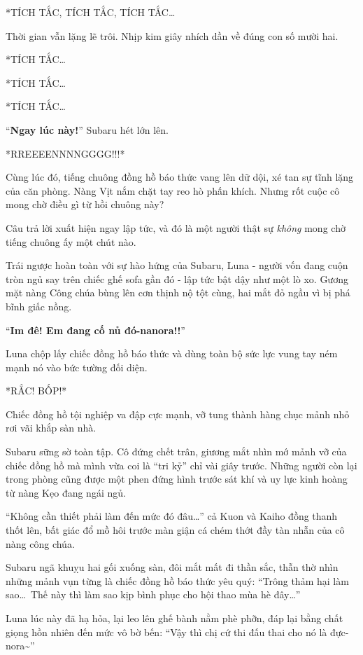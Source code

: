 \documentclass[../main.tex]{subfiles}
\begin{document}
*TÍCH TẮC, TÍCH TẮC, TÍCH TẮC\dots*

Thời gian vẫn lặng lẽ trôi. Nhịp kim giây nhích dần về đúng con số mười hai.

*TÍCH TẮC\dots*

*TÍCH TẮC\dots*

*TÍCH TẮC\dots*

``\textbf{Ngay lúc này!}'' Subaru hét lớn lên.

*RREEEENNNNGGGG!!!*

Cùng lúc đó, tiếng chuông đồng hồ báo thức vang lên dữ dội, xé tan sự tĩnh lặng của căn phòng. Nàng Vịt nắm chặt tay reo hò phấn khích. Nhưng rốt cuộc cô mong chờ điều gì từ hồi chuông này?

Câu trả lời xuất hiện ngay lập tức, và đó là một người thật sự \emph{không} mong chờ tiếng chuông ấy một chút nào.

Trái ngược hoàn toàn với sự hào hứng của Subaru, Luna - người vốn đang cuộn tròn ngủ say trên chiếc ghế sofa gần đó - lập tức bật dậy như một lò xo. Gương mặt nàng Công chúa bùng lên cơn thịnh nộ tột cùng, hai mắt đỏ ngầu vì bị phá bĩnh giấc nồng.

``\textbf{Im đê! Em đang cố nủ đó-nanora!!}''

Luna chộp lấy chiếc đồng hồ báo thức và dùng toàn bộ sức lực vung tay ném mạnh nó vào bức tường đối diện.


*RẮC! BỐP!*

Chiếc đồng hồ tội nghiệp va đập cực mạnh, vỡ tung thành hàng chục mảnh nhỏ rơi vãi khắp sàn nhà.

Subaru sững sờ toàn tập. Cô đứng chết trân, giương mắt nhìn mớ mảnh vỡ của chiếc đồng hồ mà mình vừa coi là ``tri kỷ'' chỉ vài giây trước. Những người còn lại trong phòng cũng được một phen đứng hình trước sát khí và uy lực kinh hoàng từ nàng Kẹo đang ngái ngủ.

``Không cần thiết phải làm đến mức đó đâu\dots'' cả Kuon và Kaiho đồng thanh thốt lên, bất giác đổ mồ hôi trước màn giận cá chém thớt đầy tàn nhẫn của cô nàng công chúa.

Subaru ngã khuỵu hai gối xuống sàn, đôi mắt mất đi thần sắc, thẫn thờ nhìn những mảnh vụn từng là chiếc đồng hồ báo thức yêu quý: ``Trông thảm hại làm sao\dots\ Thế này thì làm sao kịp bình phục cho hội thao mùa hè đây\dots''


Luna lúc này đã hạ hỏa, lại leo lên ghế bành nằm phè phỡn, đáp lại bằng chất giọng hồn nhiên đến mức vô bờ bến: ``Vậy thì chị cứ thi đấu thai cho nó là đực-nora\~{}''
\end{document}
